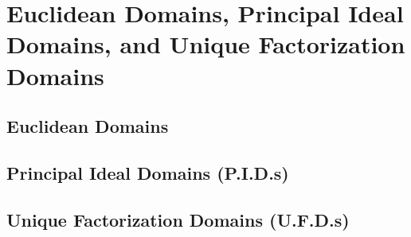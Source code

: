\chapter{Euclidean Domains, Principal Ideal Domains, and Unique Factorization Domains}

\section{Euclidean Domains}

\section{Principal Ideal Domains (P.I.D.s)}

\section{Unique Factorization Domains (U.F.D.s)}

